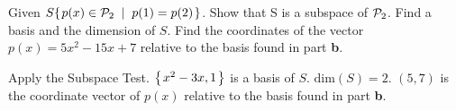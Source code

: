 
\begin{Exercise}[
name={},
title={}, 
difficulty=0,
origin={\cite{BS}}]
Given $S\mbox{$\left\{\hspace{0.1em}p(x)\in\mathcal{P}_2 \;\;\middle|\;\; p(1)=p(2)\hspace{0.1em}\right\}$}$.
\Question Show that S is a subspace of $\mathcal{P}_2$.
\Question Find a basis and the dimension of $S$.
\Question Find the coordinates of the vector $p(x)=5x^2-15x+7$ relative to the basis found in part \textbf{b}.
\end{Exercise}

\begin{Answer}
\Question Apply the Subspace Test.
\Question $\mbox{$\left\{\hspace{0.1em}x^2-3x, 1\hspace{0.1em}\right\}$}$ is a basis of $S$. $\text{dim}(S)=2$.
\Question $(5 ,7)$ is the coordinate vector of $p(x)$ relative to the basis found in part \textbf{b}.
\end{Answer}
